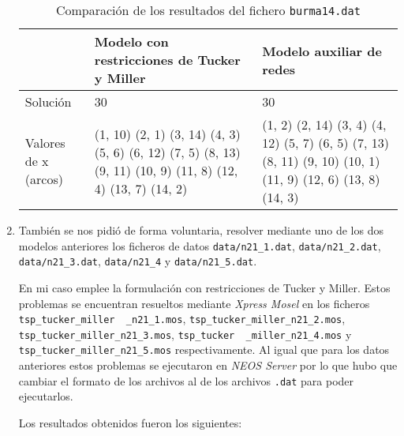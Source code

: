 \documentclass[a4paper,11pt]{article}
\begin{document}
\begin{enumerate}
\begin{table}[!htbp]
\label{results_100}
\centering
\begin{tabularx}{\textwidth}{|p{2cm}|X|X|}
\hline
& Modelo con restricciones de Tucker y Miller & Modelo auxiliar de redes \\ \hline
Solución	& 30	& 30	\\ \hline
Valores de x (arcos)	& (1, 10) (2, 1) (3, 14) (4, 3) (5, 6) (6, 12) (7, 5) (8, 13) (9, 11) (10, 9) (11, 8) (12, 4) (13, 7) (14, 2)	& (1, 2) (2, 14) (3, 4) (4, 12) (5, 7) (6, 5) (7, 13) (8, 11) (9, 10) (10, 1) (11, 9) (12, 6) (13, 8) (14, 3) \\ \hline
\end{tabularx}
\caption{Comparación de los resultados del fichero \texttt{burma14.dat}}
\end{table}

\item También se nos pidió de forma voluntaria, resolver mediante uno de los dos modelos anteriores los ficheros de datos \texttt{data/n21\_1.dat}, \texttt{data/n21\_2.dat}, \texttt{data/n21\_3.dat}, \texttt{data/n21\_4} y \texttt{data/n21\_5.dat}.

En mi caso emplee la formulación con restricciones de Tucker y Miller. Estos problemas se encuentran resueltos mediante \textit{Xpress Mosel} en los ficheros \texttt{tsp\_tucker\_miller \ \_n21\_1.mos}, \texttt{tsp\_tucker\_miller\_n21\_2.mos}, \texttt{tsp\_tucker\_miller\_n21\_3.mos}, \texttt{tsp\_tucker \ \_miller\_n21\_4.mos} y \texttt{tsp\_tucker\_miller\_n21\_5.mos} respectivamente. Al igual que para los datos anteriores estos problemas se ejecutaron en \textit{NEOS Server} por lo que hubo que cambiar el formato de los archivos al de los archivos \texttt{.dat} para poder ejecutarlos.

Los resultados obtenidos fueron los siguientes:


\end{enumerate}
\end{document}
